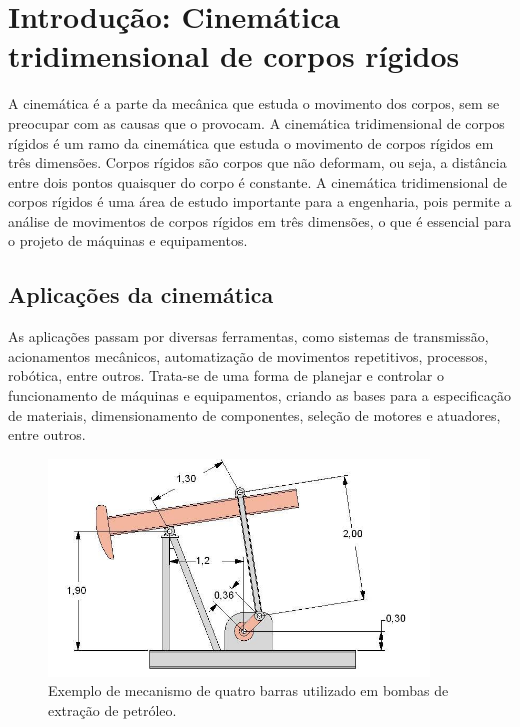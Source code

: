 \section{Introdução: Cinemática tridimensional de corpos rígidos}
\label{sec:introducao}

A cinemática é a parte da mecânica que estuda o movimento dos corpos, sem se preocupar com as causas que o provocam. A cinemática tridimensional de corpos rígidos é um ramo da cinemática que estuda o movimento de corpos rígidos em três dimensões. Corpos rígidos são corpos que não deformam, ou seja, a distância entre dois pontos quaisquer do corpo é constante. A cinemática tridimensional de corpos rígidos é uma área de estudo importante para a engenharia, pois permite a análise de movimentos de corpos rígidos em três dimensões, o que é essencial para o projeto de máquinas e equipamentos.

\subsection{Aplicações da cinemática}
\label{sec:aplicacoes}

As aplicações passam por diversas ferramentas, como sistemas de transmissão, acionamentos mecânicos, automatização de movimentos repetitivos, processos, robótica, entre outros.
Trata-se de uma forma de planejar e controlar o funcionamento de máquinas e equipamentos, criando as bases para a especificação de materiais, dimensionamento de componentes, seleção de motores e atuadores, entre outros.

\begin{figure}[h]
    \centering
    \includegraphics[width=0.9\textwidth]{images/mec4barras}
    \caption{Exemplo de mecanismo de quatro barras utilizado em bombas de extração de petróleo.}
    \label{fig:mec4barras}
\end{figure}


